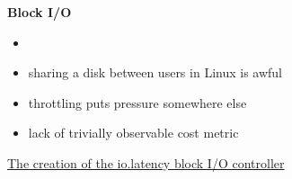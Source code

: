 \documentclass[usenames,dvipsnames, 18pt, compress, aspectratio=169]{beamer}
\begin{document}






\begin{frame}
    \frametitle{}
    \begin{center}
    \textbf{Block I/O}

            \begin{itemize}
                \item <+->
            \end{itemize}

            \begin{itemize}[label={\MVRightarrow}]
                \item<+-> sharing a disk between users in Linux is awful
                \item<+-> throttling puts pressure somewhere else
                \item<+-> lack of trivially observable cost metric
            \end{itemize}

        \normalsize{\href{https://lwn.net/Articles/782876/}
                   {\color{black}The creation of the io.latency block I/O controller}}

    \end{center}
\end{frame}
\end{document}
